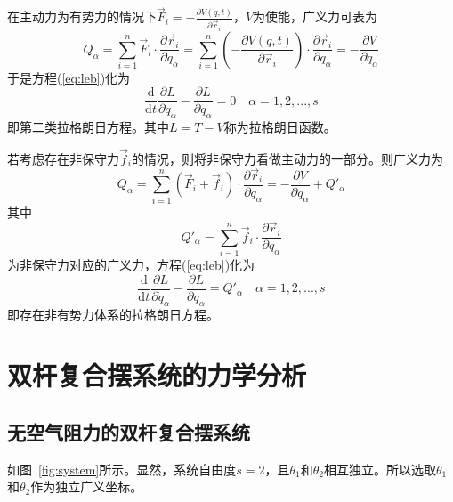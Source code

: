 \documentclass[a4paper,12pt,titlepage]{article}
\begin{document}
在主动力为有势力的情况下$\vec{F}_i=-\frac{\partial V(q,t)}{\partial \vec{r}_i} $，$V$为使能，广义力可表为
\begin{equation}
	Q_\alpha=\sum_{i=1}^n \vec{F}_i\cdot \frac{\partial \vec{r}_i}{\partial q_\alpha}=\sum_{i=1}^{n}\left(-\frac{\partial V(q,t)}{\partial \vec{r}_i}\right)\cdot\frac{\partial \vec{r}_i}{\partial q_\alpha}=-\frac{\partial V}{\partial q_\alpha}
\end{equation}
于是方程(\ref{eq:leb})化为
\begin{equation}
\label{eq:le1}
	\frac{\mathrm{d}}{\mathrm{d}t}\frac{\partial L}{\partial \dot{q}_\alpha}-\frac{\partial L}{\partial q_\alpha}=0 \quad \alpha=1,2,...,s
\end{equation}
即第二类拉格朗日方程。其中$L=T-V$称为拉格朗日函数。

若考虑存在非保守力$\vec{f}_i$的情况，则将非保守力看做主动力的一部分。则广义力为
\begin{equation}
	Q_\alpha=\sum_{i=1}^n \left(\vec{F}_i+\vec{f}_i\right)\cdot \frac{\partial \vec{r}_i}{\partial q_\alpha}=-\frac{\partial V}{\partial q_\alpha}+Q'_\alpha
\end{equation}
其中
\begin{equation}
\label{eq:force}
	Q'_\alpha=\sum_{i=1}^n \vec{f}_i\cdot \frac{\partial \vec{r}_i}{\partial q_\alpha}
\end{equation}为非保守力对应的广义力，方程(\ref{eq:leb})化为
\begin{equation}
\label{eq:le2}
	\frac{\mathrm{d}}{\mathrm{d}t}\frac{\partial L}{\partial \dot{q}_\alpha}-\frac{\partial L}{\partial q_\alpha}=Q'_\alpha \quad \alpha=1,2,...,s
\end{equation}
即存在非有势力体系的拉格朗日方程。

\section{双杆复合摆系统的力学分析} %
\label{sec:anlysis of mechanics}
\subsection{无空气阻力的双杆复合摆系统}
如图~\ref{fig:system}所示。显然，系统自由度$s=2$，且$\theta_1$和$\theta_2$相互独立。所以选取$\theta_1$和$\theta_2$作为独立广义坐标。
\end{document}
